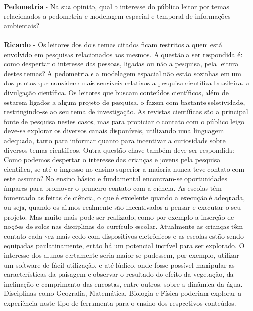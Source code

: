 \\
\textbf{Pedometria} - Na sua opinião, qual o interesse do público leitor por temas relacionados a pedometria e modelagem espacial e temporal de informações ambientais?\\
\\
\textbf{Ricardo} - Os leitores dos dois temas citados ficam restritos a quem está envolvido em pesquisas relacionados aos mesmos. A questão a ser respondida é: como despertar o interesse das pessoas, ligadas ou não à pesquisa, pela leitura destes temas? A pedometria e a modelagem espacial não estão sozinhas em um dos pontos que considero mais sensíveis relativos a pesquisa científica brasileira: a divulgação científica. Os leitores que buscam conteúdos científicos, além de estarem ligados a algum projeto de pesquisa, o fazem com bastante seletividade, restringindo-se ao seu tema de investigação. As revistas científicas são a principal fonte de pesquisa nestes casos, mas para propiciar o contato com o público leigo deve-se explorar os diversos canais disponíveis, utilizando uma linguagem adequada, tanto para informar quanto para incentivar a curiosidade sobre diversos temas científicos. Outra questão chave também deve ser respondida: Como podemos despertar o interesse das crianças e jovens pela pesquisa científica, se até o ingresso no ensino superior a maioria nunca teve contato com este assunto? No ensino básico e fundamental encontram-se oportunidades ímpares para promover o primeiro contato com a ciência. As escolas têm fomentado as feiras de ciência, o que é excelente quando a execução é adequada, ou seja, quando os alunos realmente são incentivados a pensar e executar o seu projeto. Mas muito mais pode ser realizado, como por exemplo a inserção de noções de solos nas disciplinas do currículo escolar. Atualmente as crianças têm contato cada vez mais cedo com dispositivos eletrônicos e as escolas estão sendo equipadas paulatinamente, então há um potencial incrível para ser explorado. O interesse dos alunos certamente seria maior se pudessem, por exemplo, utilizar um software de fácil utilização, e até lúdico, onde fosse possível manipular as características da paisagem e observar o resultado do efeito da vegetação, da inclinação e comprimento das encostas, entre outros, sobre a dinâmica da água. Disciplinas como Geografia, Matemática, Biologia e Física poderiam explorar a experiência neste tipo de ferramenta para o ensino dos respectivos conteúdos.








